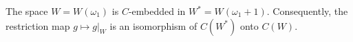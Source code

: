 The space $W = W(\omega_1)$ is $C$-embedded in $W^* = W(\omega_1 + 1)$. Consequently, the restriction map $g \mapsto g|_W$ is an isomorphism of $C(W^*)$ onto $C(W)$.
